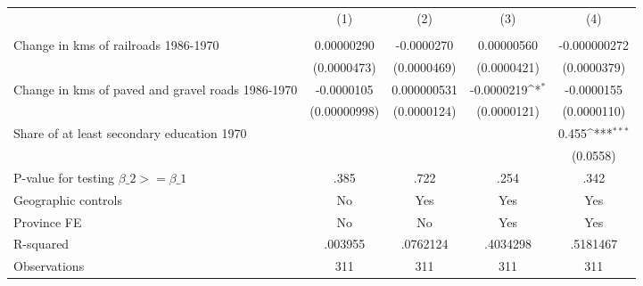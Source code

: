 {
\def\sym#1{\ifmmode^{#1}\else\(^{#1}\)\fi}
\begin{tabular}{l*{4}{c}}
\hline\hline
                &\multicolumn{1}{c}{(1)}&\multicolumn{1}{c}{(2)}&\multicolumn{1}{c}{(3)}&\multicolumn{1}{c}{(4)}\\
                &\multicolumn{1}{c}{}&\multicolumn{1}{c}{}&\multicolumn{1}{c}{}&\multicolumn{1}{c}{}\\
\hline
Change in kms of railroads 1986-1970&0.00000290         &-0.0000270         &0.00000560         &-0.000000272         \\
                &(0.0000473)         &(0.0000469)         &(0.0000421)         &(0.0000379)         \\
[1em]
Change in kms of paved and gravel roads 1986-1970&-0.0000105         &0.000000531         &-0.0000219\sym{*}  &-0.0000155         \\
                &(0.00000998)         &(0.0000124)         &(0.0000121)         &(0.0000110)         \\
[1em]
Share of at least secondary education 1970&                  &                  &                  &    0.455\sym{***}\\
                &                  &                  &                  & (0.0558)         \\
\hline
P-value for testing $\beta\_{2} >= \beta\_{1}$&     .385         &     .722         &     .254         &     .342         \\
Geographic controls&       No         &      Yes         &      Yes         &      Yes         \\
Province FE     &       No         &       No         &      Yes         &      Yes         \\
R-squared       &  .003955         & .0762124         & .4034298         & .5181467         \\
Observations    &      311         &      311         &      311         &      311         \\
\hline\hline
\end{tabular}
}
